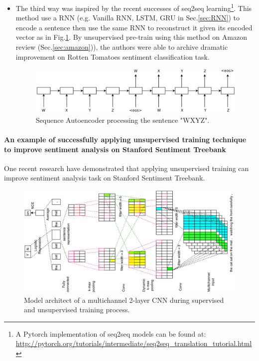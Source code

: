 \begin{itemize}
\item The third way was inspired by the recent successes of seq2seq learning\cite{SutskeverVL14}\cite{semisup-seq2seq}\footnote{A Pytorch implementation of seq2seq models can be found at: \url{http://pytorch.org/tutorials/intermediate/seq2seq_translation_tutorial.html}}. 
This method use a RNN (e.g. Vanilla RNN, LSTM, GRU in Sec.\ref{sec:RNN}) to encode a sentence then use the same RNN to reconstruct it given its encoded vector\cite{semisup-seq2seq} as in Fig.\ref{fig:rnn-autoencoder}.
By unsupervised pre-train using this method on Amazon review (Sec.\ref{sec:amazon})), the authors were able to archive dramatic improvement on Rotten Tomatoes sentiment classification task. 

\begin{figure}[H]
	\centering	\includegraphics[scale=0.43]{figure/rnn-autoencoder}
	\caption{Sequence Autoencoder processing the sentence "WXYZ"\cite{semisup-seq2seq}.}
	\label{fig:rnn-autoencoder}
\end{figure}

\end{itemize}

\paragraph{An example of successfully applying unsupervised training technique to improve sentiment analysis on Stanford Sentiment Treebank}
One recent research\cite{2-layer-cnn} have demonstrated that applying unsupervised training can improve sentiment analysis task on Stanford Sentiment Treebank.

\begin{figure}
	\centering	\includegraphics[scale=0.5, angle =-90 ]{figure/2-layer-cnn}
	\caption{Model architect of a multichannel 2-layer CNN during supervised and unsupervised training process\cite{2-layer-cnn}.}
	\label{fig:2-layer-cnn}
\end{figure}

